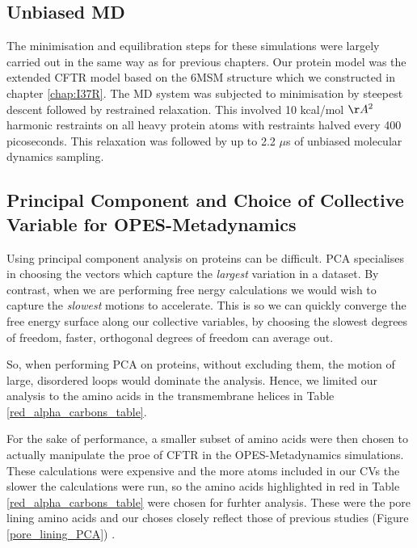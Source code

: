 \subsection{Unbiased MD }
The minimisation and equilibration steps for these simulations were largely carried out in the same way as for previous chapters. Our protein model was the extended CFTR model based on the 6MSM structure \cite{zhang2018} which we constructed in chapter \ref{chap:I37R}. The MD system was subjected to minimisation by steepest descent followed by restrained relaxation. This involved 10 kcal/mol $\AA^2$ harmonic restraints on all heavy protein atoms with restraints halved every 400 picoseconds. This relaxation was followed by up to 2.2 $\mu$s of unbiased molecular dynamics sampling.

\subsection {Principal Component and Choice of Collective Variable for OPES-Metadynamics}
Using principal component analysis on proteins can be difficult. PCA specialises in choosing the vectors which capture the \textit{largest} variation in a dataset. By contrast, when we are performing free nergy calculations we would wish to capture the \textit{slowest} motions to accelerate. This is so we can quickly converge the free energy surface along our collective variables, by choosing the slowest degrees of freedom, faster, orthogonal degrees of freedom can average out. 

So, when performing PCA on proteins, without excluding them, the motion of large, disordered loops would dominate the analysis. Hence, we limited our analysis to the amino acids in the transmembrane helices in Table \ref{red_alpha_carbons_table}. 

For the sake of performance, a smaller subset of amino acids were then chosen to actually manipulate the proe of CFTR in the OPES-Metadynamics simulations. These calculations were expensive and the more atoms included in our CVs the slower the calculations were run, so the amino acids highlighted in red in Table \ref{red_alpha_carbons_table} were chosen for furhter analysis. These were the pore lining amino acids and our choses closely reflect those of previous studies (Figure \ref{pore_lining_PCA}) \cite{hoffman2018}. 

